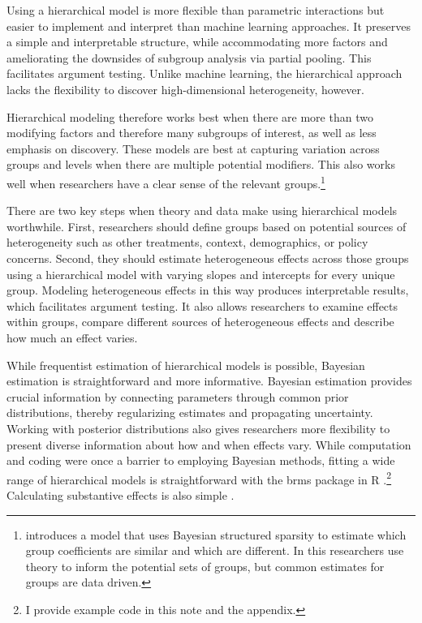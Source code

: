 \documentclass[12pt]{article}
\begin{document}
 
Using a hierarchical model is more flexible than parametric interactions but easier to implement and interpret than machine learning approaches.  
It preserves a simple and interpretable structure, while accommodating more factors and ameliorating the downsides of subgroup analysis via partial pooling. 
This facilitates argument testing.
Unlike machine learning, the hierarchical approach lacks the flexibility to discover high-dimensional heterogeneity, however.  


Hierarchical modeling therefore works best when there are more than two modifying factors and therefore many subgroups of interest, as well as less emphasis on discovery. 
These models are best at capturing variation across groups and levels when there are multiple potential modifiers.
This also works well when researchers have a clear sense of the relevant groups.\footnote{\citep{Goplerud2021} introduces a model that uses Bayesian structured sparsity to estimate which group coefficients are similar and which are different. In this researchers use theory to inform the potential sets of groups, but common estimates for groups are data driven.} 


There are two key steps when theory and data make using hierarchical models worthwhile.
First, researchers should define groups based on potential sources of heterogeneity such as other treatments, context, demographics, or policy concerns. 
Second, they should estimate heterogeneous effects across those groups using a hierarchical model with varying slopes and intercepts for every unique group. 
Modeling heterogeneous effects in this way produces interpretable results, which facilitates argument testing.
It also allows researchers to examine effects within groups, compare different sources of heterogeneous effects and describe how much an effect varies.  


While frequentist estimation of hierarchical models is possible, Bayesian estimation is straightforward and more informative.
Bayesian estimation provides crucial information by connecting parameters through common prior distributions, thereby regularizing estimates and propagating uncertainty. 
Working with posterior distributions also gives researchers more flexibility to present diverse information about how and when effects vary. 
While computation and coding were once a barrier to employing Bayesian methods, fitting a wide range of hierarchical models is straightforward with the brms package in \textsf{R} \citep{Buerkner2017}.\footnote{I provide example code in this note and the appendix.}
Calculating substantive effects is also simple \citep{ArelBundockme}.
\end{document}
